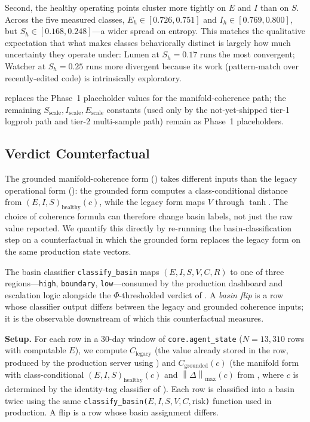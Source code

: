 \documentclass[11pt,twocolumn]{article}
\newcommand{\norm}[1]{\left\lVert #1 \right\rVert}
\begin{document}
Second, the healthy operating points cluster more tightly on
$E$ and $I$ than on $S$. Across the five measured classes,
$E_h \in [0.726, 0.751]$ and $I_h \in [0.769, 0.800]$, but
$S_h \in [0.168, 0.248]$---a wider spread on entropy. This
matches the qualitative expectation that what makes classes
behaviorally distinct is largely how much uncertainty they
operate under: Lumen at $S_h = 0.17$ runs the most convergent;
Watcher at $S_h = 0.25$ runs more divergent because its work
(pattern-match over recently-edited code) is intrinsically
exploratory.

 replaces the Phase~1 placeholder values for
the manifold-coherence path; the remaining
$S_{\text{scale}}, I_{\text{scale}}, E_{\text{scale}}$ constants
(used only by the not-yet-shipped tier-1 logprob path and
tier-2 multi-sample path) remain as Phase~1 placeholders.

\subsection{Verdict Counterfactual}
\label{sec:verdict-counterfactual}

The grounded manifold-coherence form () takes
different inputs than the legacy operational form
(): the grounded form computes a
class-conditional distance from $(E,I,S)_{\text{healthy}}(c)$,
while the legacy form maps $V$ through $\tanh$. The choice of
coherence formula can therefore change basin labels, not just the
raw value reported. We quantify this directly by
re-running the basin-classification step on a counterfactual in
which the grounded form replaces the legacy form on the same
production state vectors.

The basin classifier \texttt{classify\_basin} maps
$(E,I,S,V,C,R)$ to one of three regions---\texttt{high},
\texttt{boundary}, \texttt{low}---consumed by the production
dashboard and escalation logic alongside the
$\Phi$-thresholded verdict of . A
\emph{basin flip} is a row whose classifier output differs
between the legacy and grounded coherence inputs; it is the
observable downstream of which this counterfactual measures.

\textbf{Setup.} For each row in a $30$-day window of
\texttt{core.agent\_state} ($N = 13{,}310$ rows with computable
$E$), we compute $C_{\text{legacy}}$ (the value already stored in
the row, produced by the production server using
) and $C_{\text{grounded}}(c)$ (the manifold
form  with class-conditional
$(E,I,S)_{\text{healthy}}(c)$ and $\norm{\Delta}_{\max}(c)$ from
, where $c$ is determined by the identity-tag
classifier of ). Each row is classified
into a basin twice using the same
\texttt{classify\_basin($E,I,S,V,C,\text{risk}$)} function used
in production. A flip is a row whose basin assignment differs.
\end{document}
